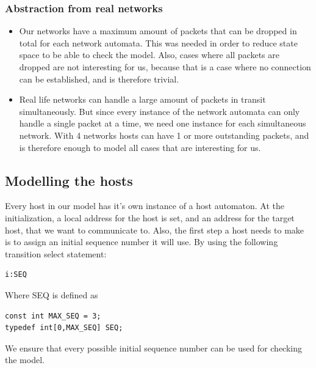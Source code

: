 \documentclass[twocolumn]{article}
\begin{document}
\subsubsection{Abstraction from real networks}
\begin{itemize}
\item Our networks have a maximum amount of packets that can be dropped in total for each network automata. This was needed in order to reduce state space to be able to check the model. Also, cases where all packets are dropped are not interesting for us, because that is a case where no connection can be established, and is therefore trivial.
\item Real life networks can handle a large amount of packets in transit simultaneously. But since every instance of the network automata can only handle a single packet at a time, we need one instance for each simultaneous network. With 4 networks hosts can have 1 or more outstanding packets, and is therefore enough to model all cases that are interesting for us.
\end{itemize}


\subsection{Modelling the hosts}
Every host in our model has it's own instance of a host automaton. At the initialization, a local address for the host is set, and an address for the target host, that we want to communicate to. Also, the first step a host needs to make is to assign an initial sequence number it will use.
By using the following transition select statement:
\begin{verbatim}i:SEQ
\end{verbatim}
Where SEQ is defined as 
\begin{verbatim}const int MAX_SEQ = 3;
typedef int[0,MAX_SEQ] SEQ;
\end{verbatim}
We ensure that every possible initial sequence number can be used for checking the model.
\end{document}
